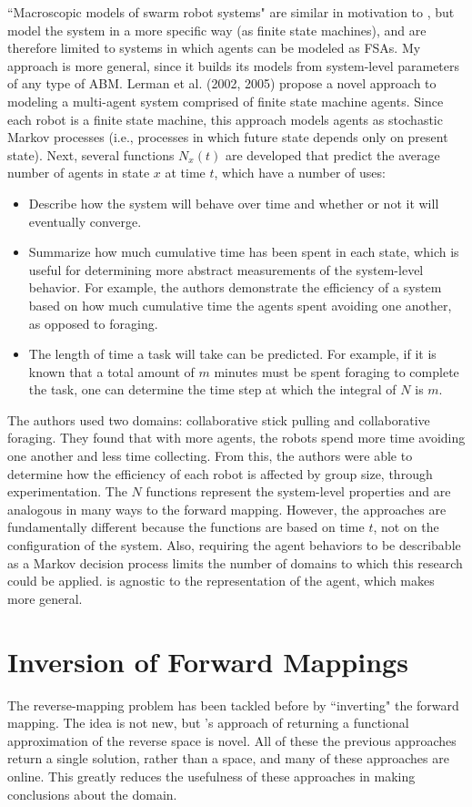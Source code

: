 ``Macroscopic models of swarm robot systems" \cite{lerman2002mmf,lerman2005rpm} are similar in motivation to \fw, but model the system in a more specific way (as finite state machines), and are therefore limited to systems in which agents can be modeled as FSAs.
My approach is more general, since it builds its models from system-level parameters of any type of ABM.
Lerman et al. (2002, 2005) propose a novel approach to modeling a multi-agent system comprised of finite state machine agents.
Since each robot is a finite state machine, this approach models agents as stochastic Markov processes (i.e., processes in which future state depends only on present state).
Next, several functions $N_x(t)$ are developed that predict the average number of agents in state $x$ at time $t$, which have a number of uses:
\begin{itemize}
\item Describe how the system will behave over time and whether or not it will eventually converge.
\item Summarize how much cumulative time has been spent in each state, which is useful for determining more abstract measurements of the system-level behavior. For example, the authors demonstrate the efficiency of a system based on how much cumulative time the agents spent avoiding one another, as opposed to foraging.
\item The length of time a task will take can be predicted. For example, if it is known that a total amount of $m$ minutes must be spent foraging to complete the task, one can determine the time step at which the integral of $N$ is $m$.
\end{itemize}
The authors used two domains: collaborative stick pulling and collaborative foraging.
They found that with more agents, the robots spend more time avoiding one another and less time collecting.
From this, the authors were able to determine how the efficiency of each robot is affected by group size, through experimentation.
The $N$ functions represent the system-level properties and are analogous in many ways to the \fw forward mapping.
However, the approaches are fundamentally different because the functions are based on time $t$, not on the configuration of the system.
Also, requiring the agent behaviors to be describable as a Markov decision process limits the number of domains to which this research could be applied.
\fw is agnostic to the representation of the agent, which makes \fw more general.


\section{Inversion of Forward Mappings}
\label{sec:invfm}
The reverse-mapping problem has been tackled before by ``inverting" the forward mapping.
The idea is not new, but  \fw's approach of returning a functional approximation of the reverse space is novel.
All of these the previous approaches return a single solution, rather than a space, and many of these approaches are online.
This greatly reduces the usefulness of these approaches in making conclusions about the domain.

